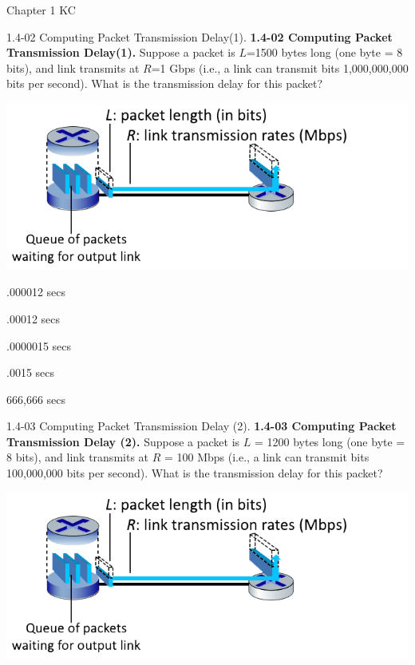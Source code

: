 \documentclass[a4paper]{article}
\begin{document}
\begin{quiz}{Chapter 1 KC}
\begin{multi}[points=1]{1.4-02 Computing Packet Transmission Delay(1).}
\textbf{1.4-02 Computing Packet Transmission Delay(1).} 
Suppose a packet is $L$=1500 bytes long (one byte = 8 bits), and link transmits at $R$=1 Gbps (i.e., a link can transmit bits 1,000,000,000 bits per second).  
What is the transmission delay for this packet?
\begin{center}
\includegraphics[width=\linewidth]{figs/1.4.2.png}
\end{center}

\item* .000012 secs
\item .00012 secs
\item .0000015 secs
\item .0015 secs
\item 666,666 secs
\end{multi}

\begin{multi}[points=1]{1.4-03 Computing Packet Transmission Delay (2).}
\textbf{1.4-03 Computing Packet Transmission Delay (2).} 
Suppose a packet is $L$ = 1200 bytes long (one byte = 8 bits), and link transmits at $R$ = 100 Mbps (i.e., a link can transmit bits 100,000,000 bits per second).  What is the transmission delay for this packet?
\begin{center}
\includegraphics[width=\linewidth]{figs/1.4.2.png}
\end{center}


\end{multi}
\end{quiz}
\end{document}
